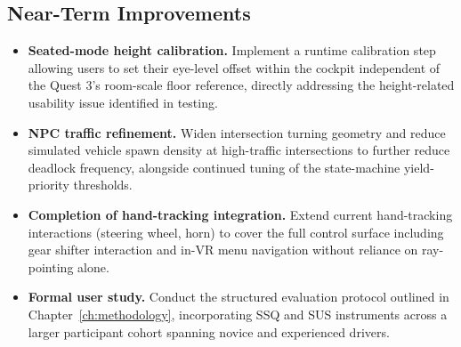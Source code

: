 \subsection{Near-Term Improvements}
\begin{itemize}
    \item \textbf{Seated-mode height calibration.} Implement a runtime calibration step allowing users to set their eye-level offset within the cockpit independent of the Quest 3's room-scale floor reference, directly addressing the height-related usability issue identified in testing.
    
    \item \textbf{NPC traffic refinement.} Widen intersection turning geometry and reduce simulated vehicle spawn density at high-traffic intersections to further reduce deadlock frequency, alongside continued tuning of the state-machine yield-priority thresholds.
    
    \item \textbf{Completion of hand-tracking integration.} Extend current hand-tracking interactions (steering wheel, horn) to cover the full control surface including gear shifter interaction and in-VR menu navigation without reliance on ray-pointing alone.
    
    \item \textbf{Formal user study.} Conduct the structured evaluation protocol outlined in Chapter~\ref{ch:methodology}, incorporating SSQ and SUS instruments across a larger participant cohort spanning novice and experienced drivers.
\end{itemize}

